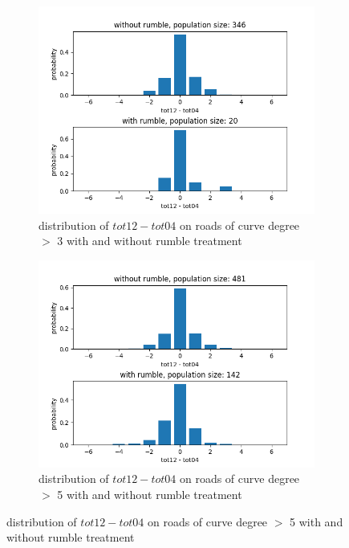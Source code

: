 \documentclass{article}
\begin{document}
\begin{figure}[H]
    \centering
    \begin{subfigure}{.5\textwidth}
        \centering
        \includegraphics[width=1\textwidth]{with-and-without-rumble-width-cat0-diff.png}
        \caption{distribution of $tot12-tot04$ on roads of curve degree $>$ 3     with and without rumble treatment}
        \label{fig:width-cat0}
    \end{subfigure}%
    \begin{subfigure}{.5\textwidth}
        \centering
        \includegraphics[width=1\textwidth]{with-and-without-rumble-width-cat2-diff.png}
        \caption{distribution of $tot12-tot04$ on roads of curve degree $>$ 5     with and without rumble treatment}
        \label{fig:width-cat2}
    \end{subfigure}
\end{figure}
\end{document}
